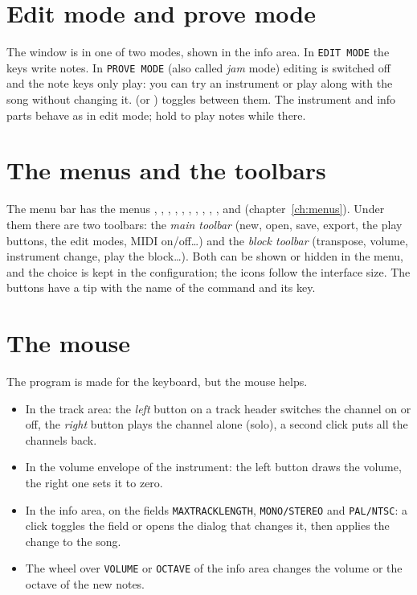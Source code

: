 

\section{Edit mode and prove mode}

The window is in one of two modes, shown in the info area. In \texttt{EDIT MODE} the keys write notes. In
\texttt{PROVE MODE} (also called \emph{jam} mode) editing is switched off and the note keys only play: you can
try an instrument or play along with the song without changing it.
 (or ) toggles between them. The instrument and info parts
behave as in edit mode; hold  to play notes while there.

\section{The menus and the toolbars}

The menu bar has the menus , , , , , ,
, , , ,  and  (chapter~\ref{ch:menus}).
Under them there are two toolbars: the \emph{main toolbar} (new, open, save, export, the play buttons, the
edit modes, MIDI on/off\ldots) and the \emph{block toolbar} (transpose, volume, instrument change, play the
block\ldots). Both can be shown or hidden in the  menu, and the choice is kept in the
configuration; the icons follow the interface size. The buttons have a tip with the name of the command and its key.

\section{The mouse}

The program is made for the keyboard, but the mouse helps.

\begin{itemize}
  \item In the track area: the \emph{left} button on a track header switches the channel on or off, the \emph{right}
        button plays the channel alone (solo), a second click puts all the channels back.
  \item In the volume envelope of the instrument: the left button draws the volume, the right one sets it to zero.
  \item In the info area, on the fields \texttt{MAXTRACKLENGTH}, \texttt{MONO/STEREO} and \texttt{PAL/NTSC}: a click
        toggles the field or opens the dialog that changes it, then applies the change to the song.
  \item The wheel over \texttt{VOLUME} or \texttt{OCTAVE} of the info area changes the volume or the octave of the new notes.
\end{itemize}
